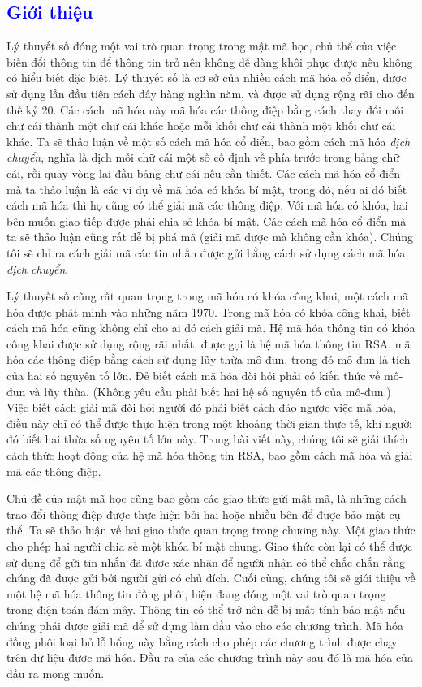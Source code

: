 \textcolor{blue}{\section{Giới thiệu}}
Lý thuyết số đóng một vai trò quan trọng trong mật mã học, chủ thể của việc biến đổi thông tin để thông tin trở nên không dễ dàng khôi phục được nếu không có hiểu biết đặc biệt. Lý thuyết số là cơ sở của nhiều cách mã hóa cổ điển, được sử dụng lần đầu tiên cách đây hàng nghìn năm, và được sử dụng rộng rãi cho đến thế kỷ 20. Các cách mã hóa này mã hóa các thông điệp bằng cách thay đổi mỗi chữ cái thành một chữ cái khác hoặc mỗi khối chữ cái thành một khối chữ cái khác. Ta sẽ thảo luận về một số cách mã hóa cổ điển, bao gồm cách mã hóa \textit{dịch chuyển}, nghĩa là dịch mỗi chữ cái một số cố định về phía trước trong bảng chữ cái, rồi quay vòng lại đầu bảng chữ cái nếu cần thiết. Các cách mã hóa cổ điển mà ta thảo luận là các ví dụ về mã hóa có khóa bí mật, trong đó, nếu ai đó biết cách mã hóa thì họ cũng có thể giải mã các thông điệp. Với mã hóa có khóa, hai bên muốn giao tiếp được phải chia sẻ khóa bí mật. Các cách mã hóa cổ điển mà ta sẽ thảo luận cũng rất dễ bị phá mã (giải mã được mà không cần khóa). Chúng tôi sẽ chỉ ra cách giải mã các tin nhắn được gửi bằng cách sử dụng cách mã hóa \textit{dịch chuyển}.

Lý thuyết số cũng rất quan trọng trong mã hóa có khóa công khai, một cách mã hóa được phát minh vào những năm 1970. Trong mã hóa có khóa công khai, biết cách mã hóa cũng không chỉ cho ai đó cách giải mã. Hệ mã hóa thông tin có khóa công khai được sử dụng rộng rãi nhất, được gọi là hệ mã hóa thông tin RSA, mã hóa các thông điệp bằng cách sử dụng lũy thừa mô-đun, trong đó mô-đun là tích của hai số nguyên tố lớn. Đẻ biết cách mã hóa đòi hỏi phải có kiến thức về mô-đun và lũy thừa. (Không yêu cầu phải biết hai hệ số nguyên tố của mô-đun.) Việc biết cách giải mã đòi hỏi người đó phải biết cách đảo ngược việc mã hóa, điều này chỉ có thể được thực hiện trong một khoảng thời gian thực tế, khi người đó biết hai thừa số nguyên tố lớn này. Trong bài viết này, chúng tôi sẽ giải thích cách thức hoạt động của hệ mã hóa thông tin RSA, bao gồm cách mã hóa và giải mã các thông điệp.

Chủ đề của mật mã học cũng bao gồm các giao thức gửi mật mã, là những cách trao đổi thông điệp được thực hiện bởi hai hoặc nhiều bên để được bảo mật cụ thể. Ta sẽ thảo luận về hai giao thức quan trọng trong chương này. Một giao thức cho phép hai người chia sẻ một khóa bí mật chung. Giao thức còn lại có thể được sử dụng để gửi tin nhắn đã được xác nhận để người nhận có thể chắc chắn rằng chúng đã được gửi bởi người gửi có chủ đích. Cuối cùng, chúng tôi sẽ giới thiệu về một hệ mã hóa thông tin đồng phôi, hiện đang đóng một vai trò quan trọng trong điện toán đám mây. Thông tin có thể trở nên dễ bị mất tính bảo mật nếu chúng phải được giải mã để sử dụng làm đầu vào cho các chương trình. Mã hóa đồng phôi loại bỏ lỗ hổng này bằng cách cho phép các chương trình được chạy trên dữ liệu được mã hóa. Đầu ra của các chương trình này sau đó là mã hóa của đầu ra mong muốn.

